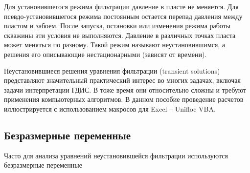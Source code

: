 Для установившегося режима фильтрации давление в пласте не меняется. Для псевдо-установившегося режима постоянным остается перепад давления между пластом и забоем. После запуска, остановки или изменения режима работы скважины эти условия не выполняются. Давление в различных точках пласта может меняться по разному. Такой режим называют неустановившимся, а решения его описывающие нестационарными (зависят от времени).

Неустановившиеся решения уравнения фильтрации (transient solutions) представляют значительный практический интерес во многих задачах, включая задачи интерпретации ГДИС. В тоже время они относительно сложны и требуют применения компьютерных алгоритмов. В данном пособие проведение расчетов иллюстрируется с использованием макросов для Excel -- Unifloc VBA.

\subsection{Безразмерные переменные}

Часто для анализа уравнений неустановившейся фильтрации используются безразмерные переменные 


